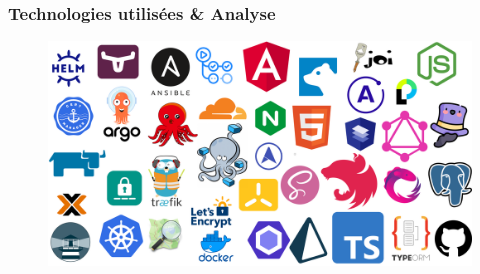 \documentclass[aspectratio=169]{beamer}
\begin{document}
    \begin{frame}
        \frametitle{Technologies utilisées \& Analyse}
        \begin{figure}[h]
            \centering
            \includegraphics[width=1\textwidth]{imgs/used tech}\label{fig:figure}
        \end{figure} %
    \end{frame}
\end{document}
